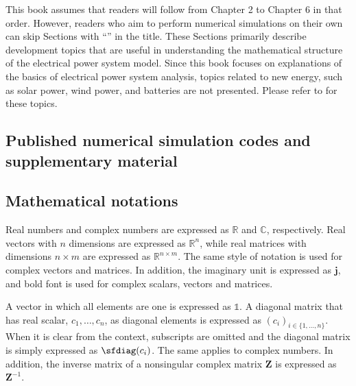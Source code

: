 \documentclass[graybox, envcountchap]{svmult}
\begin{document}
This book assumes that readers will follow from Chapter 2 to Chapter 6 in that
order.  However, readers who aim to perform numerical simulations on their own
can skip Sections with “\advanced” in the title.  These Sections primarily
describe development topics that are useful in understanding the mathematical
structure of the electrical power system model.  Since this book focuses on
explanations of the basics of electrical power system analysis, topics related
to new energy, such as solar power, wind power, and batteries are not presented.
Please refer to \cite{sadamoto2019dynamic} for these topics.

\subsection{Published numerical simulation codes and supplementary material}



\subsection{Mathematical notations}

Real numbers and complex numbers are expressed as $\mathbb{R}$ and $\mathbb{C}$,
respectively. Real vectors with $n$ dimensions are expressed as $\mathbb{R}^n$,
while real matrices with dimensions $n\times m$  are expressed as
$\mathbb{R}^{n\times m}$. The same style of notation is used for complex vectors
and matrices. In addition, the imaginary unit is expressed as $\bm{j}$, and bold
font is used for complex scalars, vectors and matrices.

A vector in which all elements are one is expressed as $\mathds{1}$. A diagonal
matrix that has real scalar, $c_1,\ldots,c_n$, as diagonal elements is expressed
as $(c_i)_{i\in\{1,\ldots, n\}}$. When it is clear from the context, subscripts
are omitted and the diagonal matrix is simply expressed as $\sfdiag(c_i)$. The
same applies to complex numbers. In addition, the inverse matrix of a
nonsingular complex matrix $\bm{Z}$ is expressed as $\bm{Z}^{-1}$.
\end{document}
